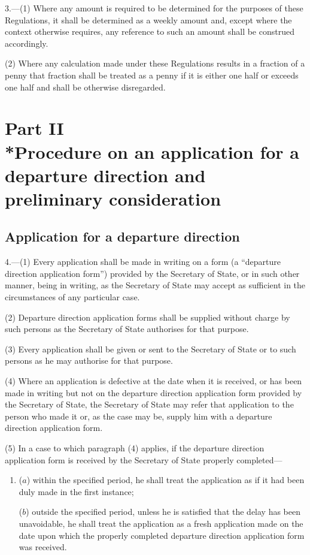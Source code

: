 \documentclass[12pt,a4paper]{article}
\begin{document}
3.—(1) Where any amount is required to be determined for
the purposes of these Regulations, it shall be determined as a weekly amount
and, except where the context otherwise requires, any reference to such an
amount shall be construed accordingly.

(2) Where any calculation made under these Regulations results in a fraction of
a penny that fraction shall be treated as a penny if it is either one half or
exceeds one half and shall be otherwise disregarded.

\section[Part II --- Procedure on an application for a departure direction and preliminary consideration]{Part II\\*Procedure on an application for a departure direction and preliminary consideration}

\renewcommand\parthead{--- Part II}

\subsection[4. Application for a departure direction]{Application for a departure direction}

4.—(1) Every application shall
be made in writing on a form (a “departure direction application form”) provided
by the Secretary of State, or in such other manner, being in writing, as the
Secretary of State may accept as sufficient in the circumstances of any
particular case.

(2) Departure direction application forms shall be supplied without charge by
such persons as the Secretary of State authorises for that purpose.

(3) Every application shall be given or sent to the Secretary of State or to
such persons as he may authorise for that purpose.

(4) Where an application is defective at the date when it is received, or has
been made in writing but not on the departure direction application form
provided by the Secretary of State, the Secretary of State may refer that
application to the person who made it or, as the case may be, supply him with a
departure direction application form.

(5) In a case to which paragraph (4) applies, if the departure direction
application form is received by the Secretary of State properly completed—
\begin{enumerate}\item[]
($a$) within the specified period, he shall treat the application as if it had been
duly made in the first instance;

($b$) outside the specified period, unless he is satisfied that the delay has been
unavoidable, he shall treat the application as a fresh application made on the
date upon which the properly completed departure direction application form was
received.
\end{enumerate}
\end{document}
